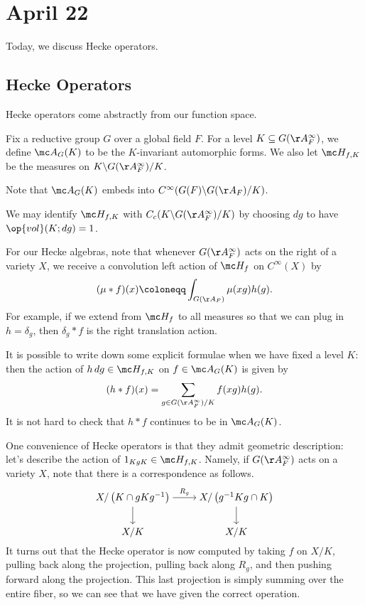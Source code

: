 \documentclass[../notes.tex]{subfiles}
\begin{document}
\section{April 22}
Today, we discuss Hecke operators.

\subsection{Hecke Operators}
Hecke operators come abstractly from our function space.
\begin{notation}
	Fix a reductive group $G$ over a global field $F$. For a level $K\subseteq G(\AA_F^\infty)$, we define $\mc A_G(K)$ to be the $K$-invariant automorphic forms. We also let $\mc H_{f,K}$ be the measures on $K\backslash G(\AA_F^\infty)/K$.
\end{notation}
\begin{remark}
	Note that $\mc A_G(K)$ embeds into $C^\infty(G(F)\backslash G(\AA_F)/K)$.
\end{remark}
\begin{remark}
	We may identify $\mc H_{f,K}$ with $C_c(K\backslash G(\AA_F^\infty)/K)$ by choosing $dg$ to have $\op{vol}(K;dg)=1$.
\end{remark}
For our Hecke algebras, note that whenever $G(\AA_F^\infty)$ acts on the right of a variety $X$, we receive a convolution left action of $\mc H_f$ on $C^\infty(X)$ by
\[(\mu*f)(x)\coloneqq\int_{G(\AA_F)}\mu(xg)h(g).\]
For example, if we extend from $\mc H_f$ to all measures so that we can plug in $h=\delta_g$, then $\delta_g*f$ is the right translation action.
\begin{remark}
	It is possible to write down some explicit formulae when we have fixed a level $K$: then the action of $h\,dg\in\mc H_{f,K}$ on $f\in\mc A_G(K)$ is given by
	\[(h*f)(x)=\sum_{g\in G(\AA_F^\infty)/K}f(xg)h(g).\]
	It is not hard to check that $h*f$ continues to be in $\mc A_G(K)$.
\end{remark}
\begin{example} \label{ex:hecke-action-correspondence}
	One convenience of Hecke operators is that they admit geometric description: let's describe the action of $1_{KgK}\in\mc H_{f,K}$. Namely, if $G(\AA_F^\infty)$ acts on a variety $X$, note that there is a correspondence as follows.
	\[\begin{tikzcd}[cramped]
		{X/\left(K\cap gKg^{-1}\right)} & {X/\left(g^{-1}Kg\cap K\right)} \\
		{X/K} & {X/K}
		\arrow["{R_g}", from=1-1, to=1-2]
		\arrow[from=1-1, to=2-1]
		\arrow[from=1-2, to=2-2]
	\end{tikzcd}\]
	It turns out that the Hecke operator is now computed by taking $f$ on $X/K$, pulling back along the projection, pulling back along $R_g$, and then pushing forward along the projection. This last projection is simply summing over the entire fiber, so we can see that we have given the correct operation.
\end{example}
\end{document}
